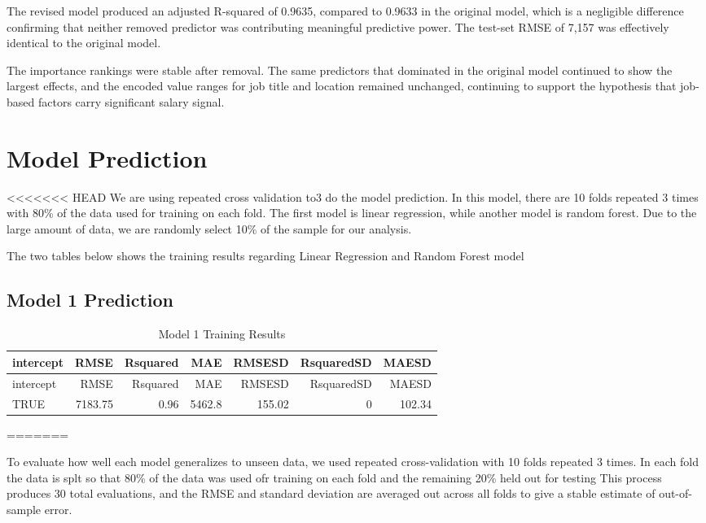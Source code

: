 \documentclass[
]{article}
\begin{document}
The revised model produced an adjusted R-squared of 0.9635, compared to
0.9633 in the original model, which is a negligible difference
confirming that neither removed predictor was contributing meaningful
predictive power. The test-set RMSE of 7,157 was effectively identical
to the original model.

The importance rankings were stable after removal. The same predictors
that dominated in the original model continued to show the largest
effects, and the encoded value ranges for job title and location
remained unchanged, continuing to support the hypothesis that job-based
factors carry significant salary signal.

\section{Model Prediction}\label{model-prediction}

\textless\textless\textless\textless\textless\textless\textless{} HEAD
We are using repeated cross validation to3 do the model prediction. In
this model, there are 10 folds repeated 3 times with 80\% of the data
used for training on each fold. The first model is linear regression,
while another model is random forest. Due to the large amount of data,
we are randomly select 10\% of the sample for our analysis.

The two tables below shows the training results regarding Linear
Regression and Random Forest model

\subsection{Model 1 Prediction}\label{model-1-prediction}

\begin{longtable}[]{@{}lrrrrrr@{}}
\caption{Model 1 Training Results}\tabularnewline
\toprule\noalign{}
intercept & RMSE & Rsquared & MAE & RMSESD & RsquaredSD & MAESD \\
\midrule\noalign{}
\endfirsthead
\toprule\noalign{}
intercept & RMSE & Rsquared & MAE & RMSESD & RsquaredSD & MAESD \\
\midrule\noalign{}
\endhead
\bottomrule\noalign{}
\endlastfoot
TRUE & 7183.75 & 0.96 & 5462.8 & 155.02 & 0 & 102.34 \\
\end{longtable}

=======

To evaluate how well each model generalizes to unseen data, we used
repeated cross-validation with 10 folds repeated 3 times. In each fold
the data is splt so that 80\% of the data was used ofr training on each
fold and the remaining 20\% held out for testing This process produces
30 total evaluations, and the RMSE and standard deviation are averaged
out across all folds to give a stable estimate of out-of-sample error.
\end{document}
